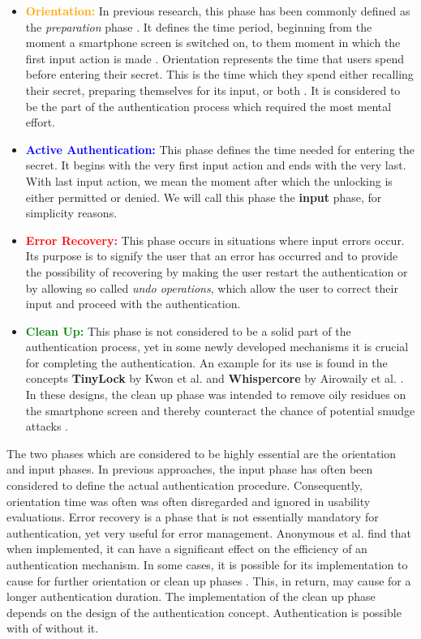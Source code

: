 \begin{itemize}
    \item \textbf{\textcolor{orange}{Orientation:}} In previous research, this phase has been commonly defined as the \textit{preparation} phase \cite{anonymous}. It defines the time period, beginning from the moment a smartphone screen is switched on, to them moment in which the first input action is made \cite{anonymous}. Orientation represents the time that users spend before entering their secret. This is the time which they spend either recalling their secret, preparing themselves for its input, or both \cite{anonymous}. It is considered to be the part of the authentication process which required the most mental effort.  
    \item \textbf{\textcolor{blue}{Active Authentication:}} This phase defines the time needed for entering the secret. It begins with the very first input action and ends with the very last. With last input action, we mean the moment after which the unlocking is either permitted or denied. We will call this phase the \textbf{input} phase, for simplicity reasons.
    \item \textbf{\textcolor{red}{Error Recovery:}} This phase occurs in situations where input errors occur. Its purpose is to signify the user that an error has occurred and to provide the possibility of recovering by making the user restart the authentication or by allowing so called \textit{undo operations}, which allow the user to correct their input and proceed with the authentication. 
    \item \textbf{\textcolor{green}{Clean Up:}} This phase is not considered to be a solid part of the authentication process, yet in some newly developed mechanisms it is crucial for completing the authentication. An example for its use is found in the concepts \textbf{TinyLock} by Kwon et al. \cite{kwon} and \textbf{Whispercore} by Airowaily et al. \cite{Airowaily}. In these designs, the clean up phase was intended to remove oily residues on the smartphone screen and thereby counteract the chance of potential smudge attacks \cite{anonymous}. 
\end{itemize}

The two phases which are considered to be highly essential are the orientation and input phases. In previous approaches, the input phase has often been considered to define the actual authentication procedure. Consequently, orientation time was often was often disregarded and ignored in usability evaluations. Error recovery is a phase that is not essentially mandatory for authentication, yet very useful for error management. Anonymous et al. \cite{anonymous} find that when implemented, it can have a significant effect on the efficiency of an authentication mechanism. In some cases, it is possible for its implementation to cause for further orientation or clean up phases \cite{anonymous}. This, in return, may cause for a longer authentication duration. The implementation of the clean up phase depends on the design of the authentication concept. Authentication is possible with of without it. \\

